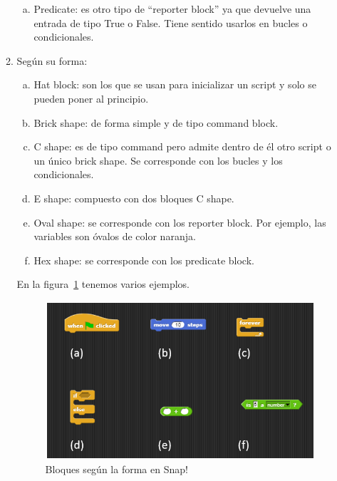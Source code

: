 \documentclass[a4paper, 12pt]{book}
\begin{document}
\begin{itemize}
\begin{enumerate}[1)]
\begin{enumerate}[a)]
             \item Predicate: es otro tipo de ``reporter block'' ya que devuelve una entrada de tipo True o False. Tiene sentido usarlos en bucles o condicionales.
            \end{enumerate}
        \item Según su forma:
             \begin{enumerate}[a)]
             \item Hat block: son los que se usan para inicializar un script y solo se pueden poner al principio.
             \item Brick shape: de forma simple y de tipo command block.
             \item C shape: es de tipo command pero admite dentro de él otro script o un único brick shape. Se corresponde con los bucles y los condicionales.
             \item E shape: compuesto con dos bloques C shape.
             \item Oval shape: se corresponde con los reporter block. Por ejemplo, las variables son óvalos de color naranja.
             \item Hex shape: se corresponde con los predicate block.
             \end{enumerate}
        En la figura~\ref{figura:shape} tenemos varios ejemplos.
        
        \begin{figure}[h]
                        \centering
                        \includegraphics[scale=0.55]{img/shapes.PNG}
                        \caption{Bloques según la forma en Snap!}
                        \label{figura:shape}
        \end{figure}
    \end{enumerate}
    
\end{itemize}
\end{document}
